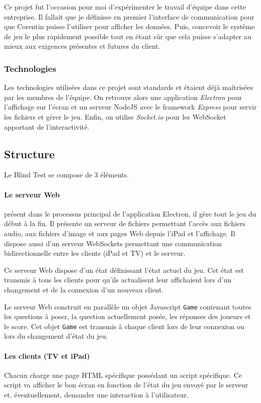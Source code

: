\documentclass{article}
\begin{document}
Ce projet fut l'occasion pour moi d'expérimenter le travail d'équipe dans cette entreprise.
Il fallait que je définisse en premier l'interface de communication pour que Corentin puisse l'utiliser pour afficher les données.
Puis, concevoir le système de jeu le plus rapidement possible tout en étant sûr que cela puisse s'adapter au mieux aux exigences présentes et futures du client.

\subsubsection{Technologies}

Les technologies utilisées dans ce projet sont standards et étaient déjà maîtrisées par les membres de l'équipe.
On retrouve alors une application \emph{Electron} pour l'affichage sur l'écran et un serveur NodeJS avec le framework \emph{Express} pour servir les fichiers et gérer le jeu.
Enfin, on utilise \emph{Socket.io} pour les WebSocket apportant de l'interactivité.

\subsection{Structure}

Le Blind Test se compose de 3 éléments.

\paragraph{Le serveur Web} présent dans le processus principal de l'application Electron, il gère tout le jeu du début à la fin.
Il présente un serveur de fichiers permettant l'accès aux fichiers audio, aux fichiers d'image et aux pages Web depuis l'iPad et l'affichage.
Il dispose aussi d'un serveur WebSockets permettant une communication bidirectionnelle entre les clients (iPad et TV) et le serveur.

Ce serveur Web dispose d'un état définissant l'état actuel du jeu.
Cet état est transmis à tous les clients pour qu'ils actualisent leur affichaient lors d'un changement et de la connexion d'un nouveau client.

Le serveur Web construit en parallèle un objet Javascript \texttt{Game} contenant toutes les questions à poser, la question actuellement posée, les réponses des joueurs et le score.
Cet objet \texttt{Game} est transmis à chaque client lors de leur connexion ou lors du changement d'état du jeu.

\paragraph{Les clients (TV et iPad)} Chacun charge une page HTML spécifique possédant un script spécifique.
Ce script va afficher le bon écran en fonction de l'état du jeu envoyé par le serveur et, éventuellement, demander une interaction à l'utilisateur.
\end{document}
